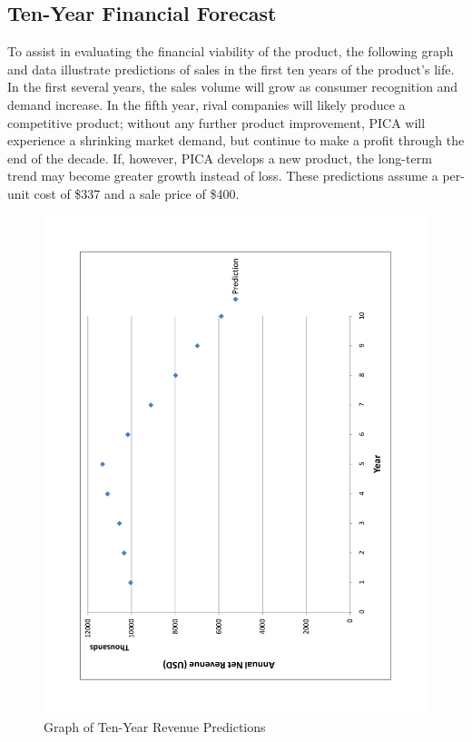 \subsection{Ten-Year Financial Forecast}

To assist in evaluating the financial viability of the product, the following graph and data illustrate predictions of sales in the first ten years of the product's life. In the first several years, the sales volume will grow as consumer recognition and demand increase. In the fifth year, rival companies will likely produce a competitive product; without any further product improvement, PICA will experience a shrinking market demand, but continue to make a profit through the end of the decade. If, however, PICA develops a new product, the long-term trend may become greater growth instead of loss. These predictions assume a per-unit cost of \$337 and a sale price of \$400.


\begin{figure}[htbp]
 \begin{center}
  \includegraphics[angle=-90,width=5.5in]{figures/DecadeForecast}
 \end{center}
 \caption{Graph of Ten-Year Revenue Predictions}
\end{figure}

